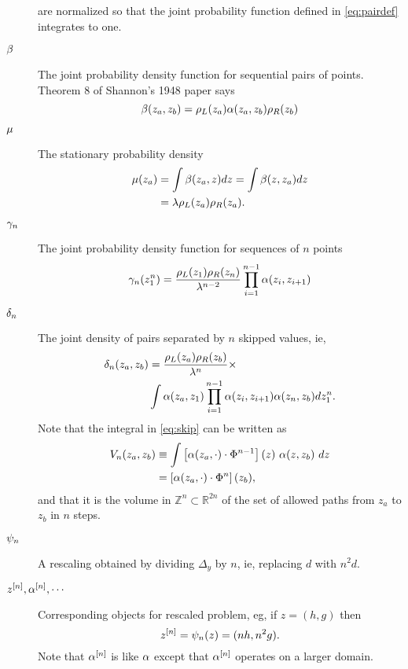 \documentclass[twocolumn]{article}
\newcommand{\field}[1]{\mathbb{#1}}
\newcommand\REAL{\field{R}}
\newcommand\Z{\field{Z}}
\begin{document}
\begin{description}
  are normalized so that the joint probability function defined in
  \eqref{eq:pairdef} integrates to one.
\item[$\beta$] The joint probability density function for sequential
  pairs of points.  Theorem 8 of Shannon's 1948 paper says
  \begin{equation}
    \label{eq:pairdef}
    \beta(z_a,z_b) = \rho_L(z_a) \alpha(z_a,z_b) \rho_R(z_b)
  \end{equation}
\item[$\mu$] The stationary probability density
  \begin{align}
    \mu(z_a) &= \int \beta(z_a,z) dz = \int \beta(z,z_a) dz
                       \nonumber \\
    \label{eq:stationary}
                     &= \lambda \rho_L(z_a) \rho_R(z_a).
  \end{align}
\item[$\gamma_{n}$] The joint probability density function for
  sequences of $n$ points
  \begin{equation}
    \label{eq:ptuple}
    \gamma_{n}(z_{1}^{n}) = \frac{\rho_L(z_1)
      \rho_R(z_n)}{\lambda^{n-2}} \prod_{i=1}^{n-1} \alpha(z_i,z_{i+1})
  \end{equation}
\item[$\delta_{n}$] The joint density of pairs separated by $n$ skipped
  values, ie,
  \begin{align}
    \delta_{n}(z_a,z_b) &= \frac{\rho_L(z_a) \rho_R(z_b)}{\lambda^n}
                        \times \nonumber \\
    \label{eq:skip}
                      & \int \alpha(z_a,z_1) \prod_{i=1}^{n-1}
                        \alpha(z_i,z_{i+1}) \alpha(z_n,z_b) d
                        z_{1}^{n}.
  \end{align}
  Note that the integral in \eqref{eq:skip} can be written as
  \begin{align}
    V_n(z_a,z_b) &\equiv \int \left[ \alpha(z_a,\cdot) \cdot
      \Phi^{n-1} \right] (z)~ \alpha(z,z_b)~ dz \nonumber \\
    \label{eq:volume}
    &= \left[ \alpha(z_a,\cdot) \cdot \Phi^{n} \right] (z_b),
  \end{align}
  and that it is the volume in $\Z^n \subset \REAL^{2n}$ of the set of
  allowed paths from $z_a$ to $z_b$ in $n$ steps.
\item[$\psi_{n}$] A rescaling obtained by dividing $\Delta_y$ by $n$,
  ie, replacing $d$ with $n^2d$.
\item[$z^{[n]}, \alpha^{[n]},\cdots $] Corresponding objects for
  rescaled problem, eg, if $z=(h,g)$ then
  \begin{equation*}
    z^{[n]} = \psi_{n}(z) = (nh, n^2g).
  \end{equation*}
  Note that $\alpha^{[n]}$ is like $\alpha$ except that
  $\alpha^{[n]}$ operates on a larger domain.
\end{description}
\end{document}
